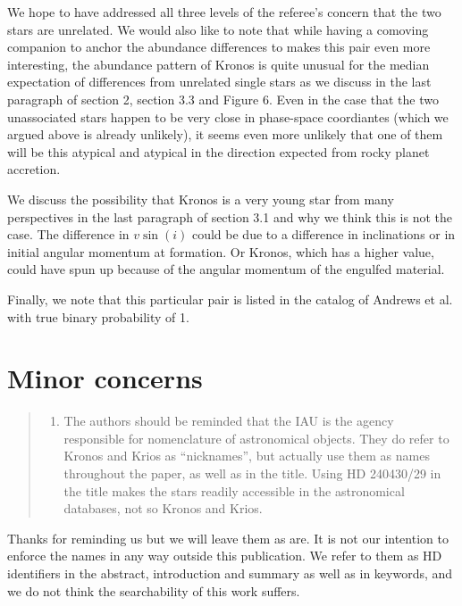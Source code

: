\documentclass[12pt]{article}
\begin{document}
We hope to have addressed all three levels of the referee's concern that the two
stars are unrelated.
We would also like to note that while having a comoving companion to anchor the
abundance differences to makes this pair even more interesting, the abundance
pattern of Kronos is quite unusual for the median expectation of differences
from unrelated single stars as we discuss in the last paragraph of section 2,
section 3.3 and Figure 6. Even in the case that the two unassociated stars
happen to be very close in phase-space coordiantes (which we argued above is
already unlikely), it seems even more unlikely that one of them will be
this atypical and atypical in the direction expected from rocky planet accretion.

We discuss the possibility that Kronos is a very young star from many
perspectives in the last paragraph of section 3.1 and why we think this is not
the case.
The difference in $v\sin(i)$ could be due to a difference in inclinations or 
in initial angular momentum at formation. Or Kronos, which has a higher value,
could have spun up because of the angular momentum of the engulfed material.

Finally, we note that this particular pair is listed in the catalog of Andrews et al.
with true binary probability of 1.

\section*{Minor concerns}\label{minor-concerns}

\begin{quote}
\begin{enumerate}
\def\labelenumi{\arabic{enumi}.}
\itemsep1pt\parskip0pt
\item
  The authors should be reminded that the IAU is the agency responsible
  for nomenclature of astronomical objects. They do refer to Kronos and
  Krios as ``nicknames'', but actually use them as names throughout the
  paper, as well as in the title. Using HD 240430/29 in the title makes
  the stars readily accessible in the astronomical databases, not so
  Kronos and Krios.
\end{enumerate}
\end{quote}
Thanks for reminding us but we will leave them as are. It is not our intention
to enforce the names in any way outside this publication. We refer to them as HD
identifiers in the abstract, introduction and summary as well as in keywords,
and we do not think the searchability of this work suffers.
\end{document}
